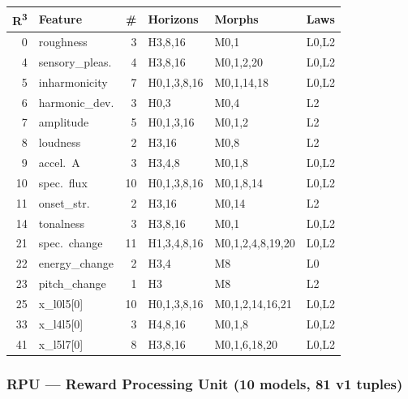 {\footnotesize
\begin{longtable}{@{}r l r l l l@{}}
\toprule
\textbf{R\textsuperscript{3}} & \textbf{Feature} & \textbf{\#}
  & \textbf{Horizons} & \textbf{Morphs} & \textbf{Laws} \\
\midrule
\endfirsthead
\midrule
\endhead
\endfoot
\bottomrule
\endlastfoot

\rowcolor{grpA}
0 & roughness & 3 & H3,8,16 & M0,1 & L0,L2 \\
\rowcolor{grpA}
4 & sensory\_pleas. & 4 & H3,8,16 & M0,1,2,20 & L0,L2 \\
\rowcolor{grpA}
5 & inharmonicity & 7 & H0,1,3,8,16 & M0,1,14,18 & L0,L2 \\
\rowcolor{grpA}
6 & harmonic\_dev. & 3 & H0,3 & M0,4 & L2 \\
\rowcolor{grpB}
7 & amplitude & 5 & H0,1,3,16 & M0,1,2 & L2 \\
\rowcolor{grpB}
8 & loudness & 2 & H3,16 & M0,8 & L2 \\
\rowcolor{grpB}
9 & accel.~A & 3 & H3,4,8 & M0,1,8 & L0,L2 \\
\rowcolor{grpB}
10 & spec.~flux & 10 & H0,1,3,8,16 & M0,1,8,14 & L0,L2 \\
\rowcolor{grpB}
11 & onset\_str. & 2 & H3,16 & M0,14 & L2 \\
\rowcolor{grpC}
14 & tonalness & 3 & H3,8,16 & M0,1 & L0,L2 \\
\rowcolor{grpD}
21 & spec.~change & 11 & H1,3,4,8,16 & M0,1,2,4,8,19,20 & L0,L2 \\
\rowcolor{grpD}
22 & energy\_change & 2 & H3,4 & M8 & L0 \\
\rowcolor{grpD}
23 & pitch\_change & 1 & H3 & M8 & L2 \\
\rowcolor{grpE}
25 & x\_l0l5[0] & 10 & H0,1,3,8,16 & M0,1,2,14,16,21 & L0,L2 \\
\rowcolor{grpE}
33 & x\_l4l5[0] & 3 & H4,8,16 & M0,1,8 & L0,L2 \\
\rowcolor{grpE}
41 & x\_l5l7[0] & 8 & H3,8,16 & M0,1,6,18,20 & L0,L2 \\
\end{longtable}
}


\subsubsection*{RPU --- Reward Processing Unit (10 models, 81 v1 tuples)}

